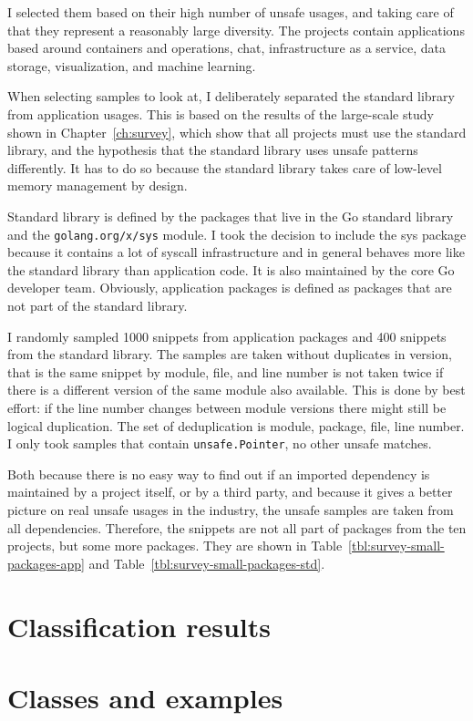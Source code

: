 I selected them based on their high number of unsafe usages, and taking care of that they represent a reasonably large
diversity.
The projects contain applications based around containers and operations, chat, infrastructure as a service, data
storage, visualization, and machine learning.

When selecting samples to look at, I deliberately separated the standard library from application usages.
This is based on the results of the large-scale study shown in Chapter~\ref{ch:survey}, which show that all projects
must use the standard library, and the hypothesis that the standard library uses unsafe patterns differently.
It has to do so because the standard library takes care of low-level memory management by design.

Standard library is defined by the packages that live in the Go standard library and the \texttt{golang.org/x/sys}
module.
I took the decision to include the sys package because it contains a lot of syscall infrastructure and in general
behaves more like the standard library than application code.
It is also maintained by the core Go developer team.
Obviously, application packages is defined as packages that are not part of the standard library.

I randomly sampled 1000 snippets from application packages and 400 snippets from the standard library.
The samples are taken without duplicates in version, that is the same snippet by module, file, and line number is not
taken twice if there is a different version of the same module also available.
This is done by best effort: if the line number changes between module versions there might still be logical
duplication.
The set of deduplication is module, package, file, line number.
I only took samples that contain \texttt{unsafe.Pointer}, no other unsafe matches.

Both because there is no easy way to find out if an imported dependency is maintained by a project itself, or by a
third party, and because it gives a better picture on real unsafe usages in the industry, the unsafe samples are taken
from all dependencies.
Therefore, the snippets are not all part of packages from the ten projects, but some more packages.
They are shown in Table~\ref{tbl:survey-small-packages-app} and Table~\ref{tbl:survey-small-packages-std}.



\section{Classification results}\label{sec:survey-small-classification}




\section{Classes and examples}\label{sec:survey-small-classes}

